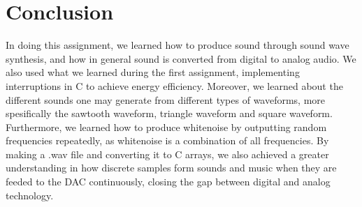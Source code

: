 \section{Conclusion}

In doing this assignment, we learned how to produce sound through sound wave synthesis, and how in general sound is converted from digital to analog audio.
We also used what we learned during the first assignment, implementing interruptions in C to achieve energy efficiency.
Moreover, we learned about the different sounds one may generate from different types of waveforms, more spesifically the sawtooth waveform, triangle waveform and square waveform.
Furthermore, we learned how to produce whitenoise by outputting random frequencies repeatedly, as whitenoise is a combination of all frequencies.
By making a .wav file and converting it to C arrays, we also achieved a greater understanding in how discrete samples form sounds and music when they are feeded to the DAC continuously, closing the gap between digital and analog technology.